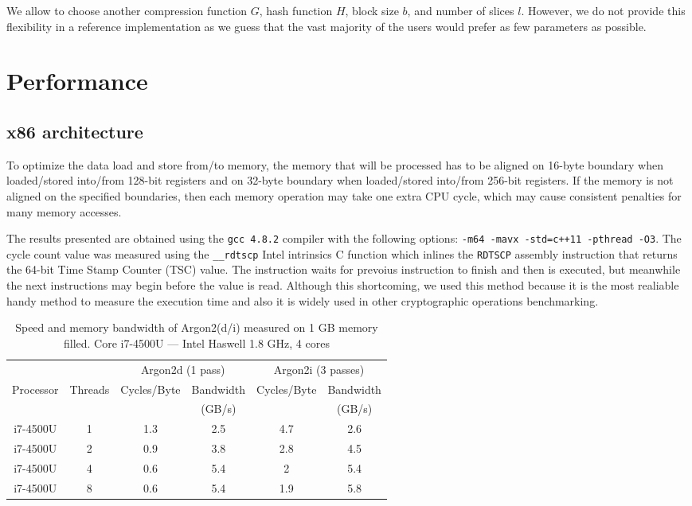 \documentclass[a4paper]{article}
\begin{document}
We allow to choose another compression function $G$, hash function $H$, block size $b$, and number of slices $l$. However, we do not provide this flexibility in a reference implementation as we guess that
the vast majority of the users would prefer as few parameters as possible.



\section{Performance}

\subsection{x86 architecture}
To optimize the data load and store from/to memory, the memory that will be processed has to be aligned on 16-byte boundary when loaded/stored into/from 128-bit registers and on 32-byte boundary when loaded/stored into/from 256-bit registers. If the memory is not aligned on the specified boundaries, then each memory operation may take one extra CPU cycle, which may cause consistent penalties for many memory accesses.


The results presented are obtained using the \texttt{gcc 4.8.2} compiler  with the following options: \texttt{-m64 -mavx -std=c++11 -pthread -O3}.
The cycle count value was measured using the \texttt{\_\_rdtscp} Intel intrinsics C function which inlines the \texttt{RDTSCP} assembly instruction that returns the 64-bit Time Stamp Counter (TSC) value. The instruction waits for prevoius instruction to finish and then is executed, but meanwhile the next instructions may begin before the value is read. Although this shortcoming, we used this method because it is the most realiable handy method to measure the execution time and also it is widely used in other cryptographic operations benchmarking.

\begin{table}
\begin{center}
\begin{tabular}{|cc||cc|cc|}
\hline
& & \multicolumn{2}{c|}{\textsf{Argon2d} (1 pass)} & \multicolumn{2}{|c|}{\textsf{Argon2i} (3 passes)}  \\
\cline{3-6}
Processor & Threads & Cycles/Byte & Bandwidth & Cycles/Byte & Bandwidth \\
& & & (GB/s) & & (GB/s)\\
\hline
 i7-4500U & 1 &1.3 & 2.5 & 4.7 & 2.6 \\
\hline
 i7-4500U & 2 &0.9& 3.8&2.8 & 4.5\\
\hline
 i7-4500U & 4 &0.6 & 5.4 & 2 & 5.4 \\
\hline
 i7-4500U & 8 & 0.6 & 5.4 & 1.9 & 5.8\\
\hline
\end{tabular}
\end{center}
\caption{Speed and memory bandwidth of Argon2(d/i) measured on 1 GB memory filled. Core i7-4500U --- Intel Haswell 1.8 GHz, 4 cores}
\label{table:cycle_per_byte_results}
\end{table}
\end{document}
